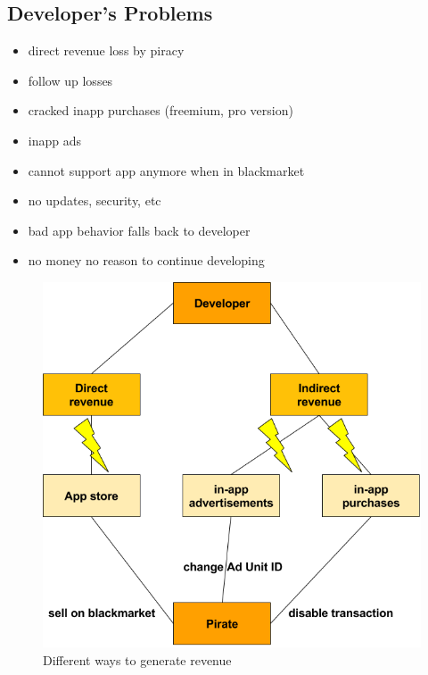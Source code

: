 \subsection{Developer's Problems} \label{subsection:foundation-piracy-developers}
\begin{itemize}
  \item direct revenue loss by piracy
  \item follow up losses
  \item cracked inapp purchases (freemium, pro version)
  \item inapp ads
  \item cannot support app anymore when in blackmarket
  \item no updates, security, etc
  \item bad app behavior falls back to developer
  \item no money no reason to continue developing
\end{itemize}
\begin{figure}[h]
    \centering
    \includegraphics[width=1\textwidth]{data/revenue.png}
    \caption{Different ways to generate revenue}
    \label{fig:revenue}
\end{figure}
